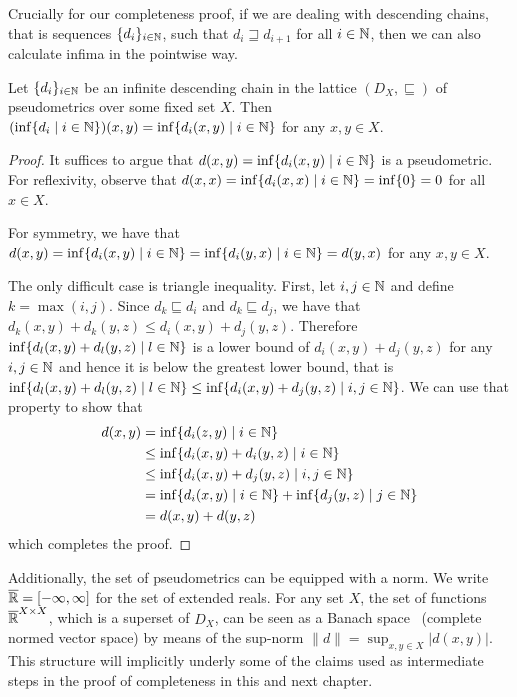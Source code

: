 Crucially for our completeness proof, if we are dealing with descending chains, that is sequences $\{d_i\}_{i \in \mathbb{N}}$, such that $d_i \sqsupseteq d_{i+1}$ for all $i \in \mathbb{N}$, then we can also calculate infima in the pointwise way.
\begin{lemma}\label{c2:lem:chain_pointwise_inf}
    Let $\{d_i\}_{i \in \mathbb{N}}$ be an infinite descending chain in the lattice $(D_X, \sqsubseteq)$ of pseudometrics over some fixed set $X$. Then $(\inf\{d_i \mid i \in \mathbb{N}\})(x,y) = \inf \{d_i(x,y) \mid i \in \mathbb{N} \}$ for any $x,y \in X$.
\end{lemma}
\begin{proof}
    It suffices to argue that $d(x,y) = \inf \{d_i(x,y) \mid i \in \mathbb{N} \}$ is a pseudometric. For reflexivity, observe that $d(x,x) = \inf \{d_i(x,x) \mid i \in \mathbb{N} \} = \inf \{ 0 \} = 0 $ for all $x \in X$. 
    
    For symmetry, we have that $d(x,y) = \inf \{d_i(x,y) \mid i \in \mathbb{N} \} =  \inf \{d_i(y,x) \mid i \in \mathbb{N} \}=d(y,x)$ for any $x, y \in X$. 
    
    The only difficult case is triangle inequality. First, let $i, j \in \mathbb{N}$ and define $k = \max(i,j)$. Since $d_k \sqsubseteq d_i$ and $d_k \sqsubseteq d_j$, we have that $d_k(x,y) + d_k(y,z) \leq d_i(x,y) + d_j(y,z)$.
    Therefore $\inf \{d_l(x,y) + d_l(y,z) \mid l \in \mathbb{N}\}$ is a lower bound of $d_i(x,y) + d_j(y,z)$ for any $i, j \in \mathbb{N}$ and hence it is below the greatest lower bound, that is $\inf \{d_l(x,y) + d_l(y,z) \mid l \in \mathbb{N}\} \leq \inf \{d_i(x,y) + d_j(y,z) \mid i,j \in \mathbb{N}\}$. We can use that property to show that
    \begin{align*}
    	d(x,y) &= \inf \{d_i(z,y) \mid i \in \mathbb{N}\} \\
    	&\leq \inf \{d_i(x,y) + d_i(y,z) \mid i \in \mathbb{N}\}\\
    	&\leq \inf \{d_i(x,y) + d_j(y,z) \mid i,j \in \mathbb{N}\}\\
    	&= \inf \{d_i(x,y) \mid i \in \mathbb{N}\} + \inf \{d_j(y,z) \mid j \in \mathbb{N}\}\\
    	&= d(x,y) + d(y,z)
    \end{align*}
	which completes the proof.
\end{proof}
Additionally, the set of pseudometrics can be equipped with a norm. We write $\overline{\mathbb{R}} = [-\infty, \infty]$ for the set of extended reals. For any set $X$, the set of functions $\overline{\mathbb{R}}^{X \times X }$, which is a superset of $D_X$, can be seen as a Banach space~\cite{Rudin:1990:Functional} (complete normed vector space) by means of the sup-norm $\|d\| = \sup_{x,y \in X} |d(x,y)|$. This structure will implicitly underly some of the claims used as intermediate steps in the proof of completeness in this and next chapter.
